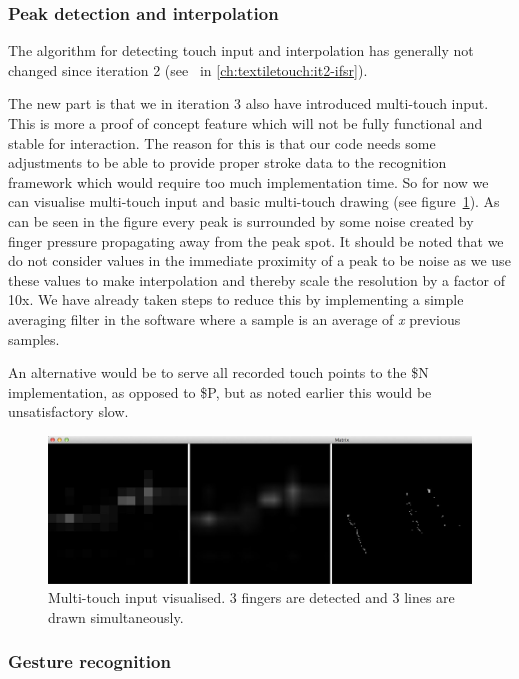 \subsubsection{Peak detection and interpolation}
The algorithm for detecting touch input and interpolation has generally not changed since iteration 2 (see~ in \ref{ch:textiletouch:it2-ifsr}).

The new part is that we in iteration 3 also have introduced multi-touch input.
This is more a proof of concept feature which will not be fully functional and stable for interaction. The reason for this is that our code needs some adjustments to be able to provide proper stroke data to the recognition framework which would require too much implementation time.
So for now we can visualise multi-touch input and basic multi-touch drawing (see figure~\ref{fig:textiletouch:multitouch}).
As can be seen in the figure every peak is surrounded by some noise created by finger pressure propagating away from the peak spot.
It should be noted that we do not consider values in the immediate proximity of a peak to be noise as we use these values to make interpolation and thereby scale the resolution by a factor of 10x.
We have already taken steps to reduce this by implementing a simple averaging filter in the software 
where a sample is an average of \emph{x} previous samples.

An alternative would be to serve all recorded touch points to the \$N implementation, as opposed to \$P, but as noted earlier this would be unsatisfactory slow.

\begin{figure}[h]
  \centering
      \includegraphics[width=.9\textwidth]{figures/touch/tt_multitouch}
  \caption{Multi-touch input visualised. 3 fingers are detected and 3 lines are drawn simultaneously.}
   \label{fig:textiletouch:multitouch}
\end{figure}

\subsubsection{Gesture recognition} 
\label{ch:textiletouch:gesture_implementation}

